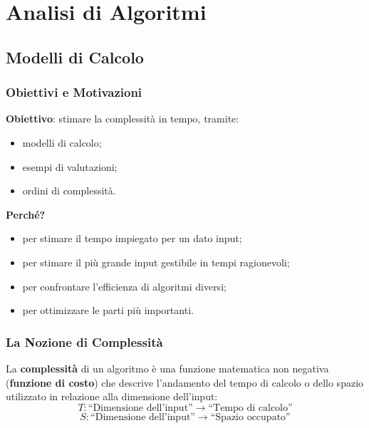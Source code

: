 \documentclass[12pt, a4paper]{article}
\begin{document}
\section{Analisi di Algoritmi}
\label{sec:analisi-algoritmi}

\subsection{Modelli di Calcolo}
\label{sec:modelli-calcolo}

\subsubsection{Obiettivi e Motivazioni}

\textbf{Obiettivo}: stimare la complessità in tempo, tramite:
\begin{itemize}
    \item modelli di calcolo;
    \item esempi di valutazioni;
    \item ordini di complessità.
\end{itemize}

\textbf{Perché?}
\begin{itemize}
    \item per stimare il tempo impiegato per un dato input;
    \item per stimare il più grande input gestibile in tempi ragionevoli;
    \item per confrontare l'efficienza di algoritmi diversi;
    \item per ottimizzare le parti più importanti.
\end{itemize}

\subsubsection{La Nozione di Complessità}

\begin{tcolorbox}[colback=lightergray!10, colframe=tocsec, title=\textbf{Definizione: Complessità}]
\label{def:complessita-formale}
La \textbf{complessità} di un algoritmo è una funzione matematica non negativa (\textbf{funzione di costo}) che descrive l'andamento del tempo di calcolo o dello spazio utilizzato in relazione alla dimensione dell'input:
$$T : \text{``Dimensione dell'input''} \to \text{``Tempo di calcolo''}$$
$$S : \text{``Dimensione dell'input''} \to \text{``Spazio occupato''}$$
\end{tcolorbox}
\end{document}
